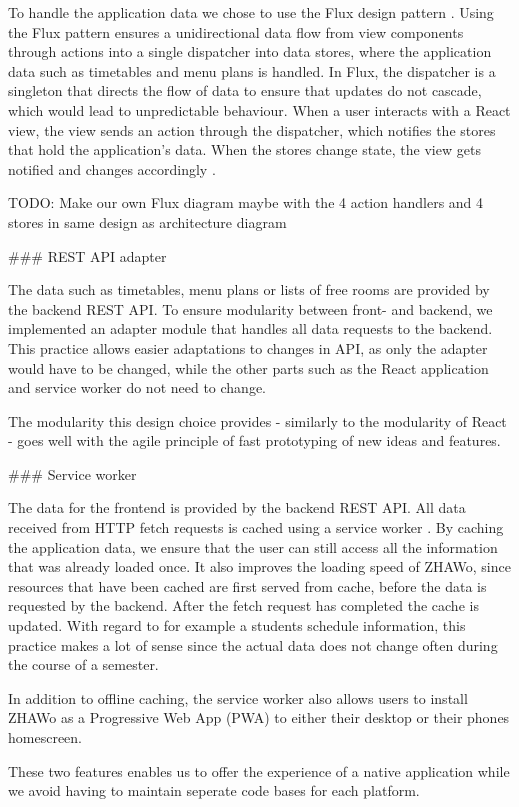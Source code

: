 \begin{markdown}
To handle the application data we chose to use the Flux design pattern \cite{Flux}. Using the Flux pattern ensures a unidirectional data flow from view components through actions into a single dispatcher into data stores, where the application data such as timetables and menu plans is handled. In Flux, the dispatcher is a singleton that directs the flow of data to ensure that updates do not cascade, which would lead to unpredictable behaviour. When a user interacts with a React view, the view sends an action through the dispatcher, which notifies the stores that hold the application’s data. When the stores change state, the view gets notified and changes accordingly \cite{Flux}.

\bigskip

TODO: Make our own Flux diagram maybe with the 4 action handlers and 4 stores in same design as architecture diagram

\bigskip

### REST API adapter

The data such as timetables, menu plans or lists of free rooms are provided by the backend REST API. To ensure modularity between front- and backend, we implemented an adapter module that handles all data requests to the backend. This practice allows easier adaptations to changes in API, as only the adapter would have to be changed, while the other parts such as the React application and service worker do not need to change.

The modularity this design choice provides - similarly to the modularity of React - goes well with the agile principle of fast prototyping of new ideas and features.

### Service worker

The data for the frontend is provided by the backend REST API. All data received from HTTP fetch requests is cached using a service worker \cite{ServiceWorker}. By caching the application data, we ensure that the user can still access all the information that was already loaded once. It also improves the loading speed of ZHAWo, since resources that have been cached are first served from cache, before the data is requested by the backend. After the fetch request has completed the cache is updated. With regard to for example a students schedule information, this practice makes a lot of sense since the actual data does not change often during the course of a semester.

In addition to offline caching, the service worker also allows users to install ZHAWo as a Progressive Web App (PWA) \cite{WhatIsPWA} to either their desktop or their phones homescreen.

These two features enables us to offer the experience of a native application while we avoid having to maintain seperate code bases for each platform.

\end{markdown}
